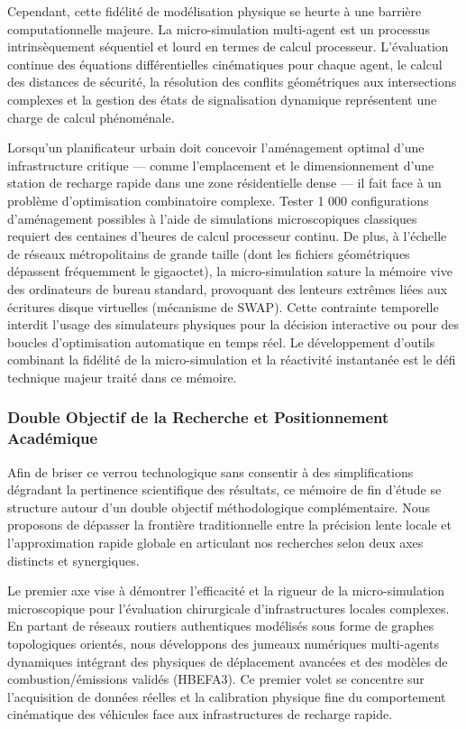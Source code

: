 \documentclass[10pt, a4paper]{article}
\begin{document}
Cependant, cette fidélité de modélisation physique se heurte à une
barrière computationnelle majeure. La micro-simulation multi-agent est
un processus intrinsèquement séquentiel et lourd en termes de calcul
processeur. L'évaluation continue des équations différentielles
cinématiques pour chaque agent, le calcul des distances de sécurité, la
résolution des conflits géométriques aux intersections complexes et la
gestion des états de signalisation dynamique représentent une charge de
calcul phénoménale.

Lorsqu'un planificateur urbain doit concevoir l'aménagement optimal
d'une infrastructure critique --- comme l'emplacement et le
dimensionnement d'une station de recharge rapide dans une zone
résidentielle dense --- il fait face à un problème d'optimisation
combinatoire complexe. Tester 1 000 configurations d'aménagement
possibles à l'aide de simulations microscopiques classiques requiert des
centaines d'heures de calcul processeur continu. De plus, à l'échelle de
réseaux métropolitains de grande taille (dont les fichiers géométriques
dépassent fréquemment le gigaoctet), la micro-simulation sature la
mémoire vive des ordinateurs de bureau standard, provoquant des lenteurs
extrêmes liées aux écritures disque virtuelles (mécanisme de SWAP).
Cette contrainte temporelle interdit l'usage des simulateurs physiques
pour la décision interactive ou pour des boucles d'optimisation
automatique en temps réel. Le développement d'outils combinant la
fidélité de la micro-simulation et la réactivité instantanée est le défi
technique majeur traité dans ce mémoire.

\subsubsection{Double Objectif de la Recherche et Positionnement
Académique}\label{double-objectif-de-la-recherche-et-positionnement-acaduxe9mique}

Afin de briser ce verrou technologique sans consentir à des
simplifications dégradant la pertinence scientifique des résultats, ce
mémoire de fin d'étude se structure autour d'un double objectif
méthodologique complémentaire. Nous proposons de dépasser la frontière
traditionnelle entre la précision lente locale et l'approximation rapide
globale en articulant nos recherches selon deux axes distincts et
synergiques.

Le premier axe vise à démontrer l'efficacité et la rigueur de la
micro-simulation microscopique pour l'évaluation chirurgicale
d'infrastructures locales complexes. En partant de réseaux routiers
authentiques modélisés sous forme de graphes topologiques orientés, nous
développons des jumeaux numériques multi-agents dynamiques intégrant des
physiques de déplacement avancées et des modèles de combustion/émissions
validés (HBEFA3). Ce premier volet se concentre sur l'acquisition de
données réelles et la calibration physique fine du comportement
cinématique des véhicules face aux infrastructures de recharge rapide.
\end{document}
